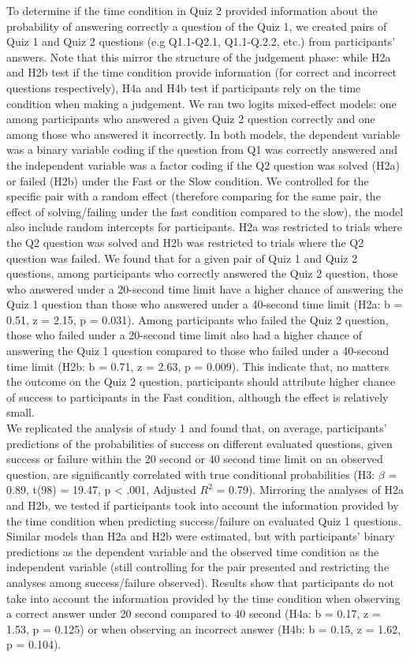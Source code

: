 \documentclass[
  10pt,
  letterpaper]{article}
\begin{document}
To determine if the time condition in Quiz 2 provided information about the probability of answering correctly a question of the Quiz 1, we created pairs of Quiz 1 and Quiz 2 questions (e.g Q1.1-Q2.1, Q1.1-Q.2.2, etc.) from participants' answers. Note that this mirror the structure of the judgement phase: while H2a and H2b test if the time condition provide information (for correct and incorrect questions respectively), H4a and H4b test if participants rely on the time condition when making a judgement. We ran two logits mixed-effect models: one among participants who answered a given Quiz 2 question correctly and one among those who answered it incorrectly. In both models, the dependent variable was a binary variable coding if the question from Q1 was correctly answered and the independent variable was a factor coding if the Q2 question was solved (H2a) or failed (H2b) under the Fast or the Slow condition. We controlled for the specific pair with a random effect (therefore comparing for the same pair, the effect of solving/failing under the fast condition compared to the slow), the model also include random intercepts for participants. H2a was restricted to trials where the Q2 question was solved and H2b was restricted to trials where the Q2 question was failed. We found that for a given pair of Quiz 1 and Quiz 2 questions, among participants who correctly answered the Quiz 2 question, those who answered under a 20-second time limit have a higher chance of answering the Quiz 1 question than those who answered under a 40-second time limit (H2a: b = 0.51, z = 2.15, p = 0.031). Among participants who failed the Quiz 2 question, those who failed under a 20-second time limit also had a higher chance of answering the Quiz 1 question compared to those who failed under a 40-second time limit (H2b: b = 0.71, z = 2.63, p = 0.009). This indicate that, no matters the outcome on the Quiz 2 question, participants should attribute higher chance of success to participants in the Fast condition, although the effect is relatively small.\\

We replicated the analysis of study 1 and found that, on average, participants' predictions of the probabilities of success on different evaluated questions, given success or failure within the 20 second or 40 second time limit on an observed question, are significantly correlated with true conditional probabilities (H3: \(\beta\) = 0.89, t(98) = 19.47, p \textless{} .001, Adjusted \(R^2\) = 0.79). Mirroring the analyses of H2a and H2b, we tested if participants took into account the information provided by the time condition when predicting success/failure on evaluated Quiz 1 questions. Similar models than H2a and H2b were estimated, but with participants' binary predictions as the dependent variable and the observed time condition as the independent variable (still controlling for the pair presented and restricting the analyses among success/failure observed). Results show that participants do not take into account the information provided by the time condition when observing a correct answer under 20 second compared to 40 second (H4a: b = 0.17, z = 1.53, p = 0.125) or when observing an incorrect answer (H4b: b = 0.15, z = 1.62, p = 0.104).
\end{document}
